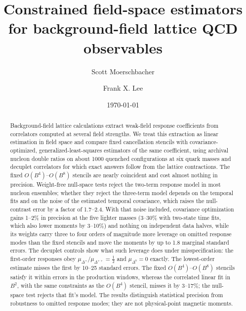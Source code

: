 \documentclass[aps,prd,reprint,twocolumn,superscriptaddress,nofootinbib,longbibliography]{revtex4-2}
\begin{document}
\title{Constrained field-space estimators for background-field lattice QCD observables}

\author{Scott Moerschbacher}

\author{Frank X. Lee}

\date{\today}

\begin{abstract}
Background-field lattice calculations extract weak-field response coefficients from correlators computed at several field strengths. We treat this extraction as linear estimation in field space and compare fixed cancellation stencils with covariance-optimized, generalized-least-squares estimators of the same coefficient, using archival nucleon double ratios on about 1000 quenched configurations at six quark masses and decuplet correlators for which exact answers follow from the lattice contractions. The fixed $O(B^4)$--$O(B^8)$ stencils are nearly coincident and cost almost nothing in precision. Weight-free null-space tests reject the two-term response model in most nucleon ensembles; whether they reject the three-term model depends on the temporal fits and on the noise of the estimated temporal covariance, which raises the null-contrast error by a factor of 1.7--2.4. With that noise included, covariance optimization gains 1--2\% in precision at the five lighter masses (3--30\% with two-state time fits, which also lower moments by 3--10\%) and nothing on independent data halves, while its weights carry three to four orders of magnitude more leverage on omitted response modes than the fixed stencils and move the moments by up to 1.8 marginal standard errors. The decuplet controls show what such leverage does under misspecification: the first-order responses obey $\mu_{\Delta^+}/\mu_{\Delta^{++}}=\tfrac12$ and $\mu_{\Delta^0}=0$ exactly. The lowest-order estimate misses the first by 10--25 standard errors. The fixed $O(B^4)$--$O(B^8)$ stencils satisfy it within errors in the production windows, whereas the correlated linear fit in $B^2$, with the same constraints as the $O(B^4)$ stencil, misses it by 3--17\%; the null-space test rejects that fit's model. The results distinguish statistical precision from robustness to omitted response modes; they are not physical-point magnetic moments.
\end{abstract}
\end{document}

